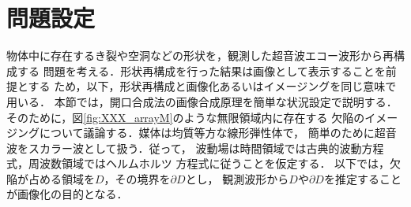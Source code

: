 \setcounter{section}{3}
\section{問題設定}
物体中に存在するき裂や空洞などの形状を，観測した超音波エコー波形から再構成する
問題を考える．形状再構成を行った結果は画像として表示することを前提とする
ため，以下，形状再構成と画像化あるいはイメージングを同じ意味で用いる．
本節では，開口合成法の画像合成原理を簡単な状況設定で説明する．
そのために，図\ref{fig:XXX_arrayM}のような無限領域内に存在する
欠陥のイメージングについて議論する．媒体は均質等方な線形弾性体で，
簡単のために超音波をスカラー波として扱う．従って，
波動場は時間領域では古典的波動方程式，周波数領域ではヘルムホルツ
方程式に従うことを仮定する．
以下では，欠陥が占める領域を$D$，その境界を$\partial D$とし，
観測波形から$D$や$\partial D$を推定することが画像化の目的となる．\\

